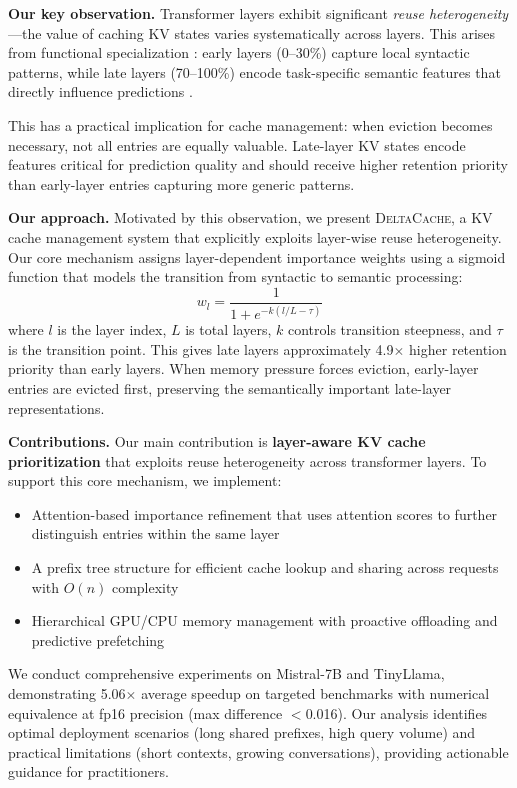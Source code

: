 \documentclass[10pt,conference]{IEEEtran}
\newcommand{\deltacache}{\textsc{DeltaCache}}
\begin{document}
\textbf{Our key observation.} Transformer layers exhibit significant \emph{reuse heterogeneity}---the value of caching KV states varies systematically across layers. This arises from functional specialization \cite{rogers2020primer,elhage2021mathematical}: early layers (0--30\%) capture local syntactic patterns, while late layers (70--100\%) encode task-specific semantic features that directly influence predictions \cite{geva2023dissecting}.

This has a practical implication for cache management: when eviction becomes necessary, not all entries are equally valuable. Late-layer KV states encode features critical for prediction quality and should receive higher retention priority than early-layer entries capturing more generic patterns.

\textbf{Our approach.} Motivated by this observation, we present \deltacache{}, a KV cache management system that explicitly exploits layer-wise reuse heterogeneity. Our core mechanism assigns layer-dependent importance weights using a sigmoid function that models the transition from syntactic to semantic processing:
\begin{equation}
w_l = \frac{1}{1 + e^{-k(l/L - \tau)}}
\end{equation}
where $l$ is the layer index, $L$ is total layers, $k$ controls transition steepness, and $\tau$ is the transition point. This gives late layers approximately 4.9$\times$ higher retention priority than early layers. When memory pressure forces eviction, early-layer entries are evicted first, preserving the semantically important late-layer representations.

\textbf{Contributions.} Our main contribution is \textbf{layer-aware KV cache prioritization} that exploits reuse heterogeneity across transformer layers. To support this core mechanism, we implement:
\begin{itemize}
\item Attention-based importance refinement that uses attention scores to further distinguish entries within the same layer
\item A prefix tree structure for efficient cache lookup and sharing across requests with $O(n)$ complexity
\item Hierarchical GPU/CPU memory management with proactive offloading and predictive prefetching
\end{itemize}

We conduct comprehensive experiments on Mistral-7B and TinyLlama, demonstrating 5.06$\times$ average speedup on targeted benchmarks with numerical equivalence at fp16 precision (max difference $<$0.016). Our analysis identifies optimal deployment scenarios (long shared prefixes, high query volume) and practical limitations (short contexts, growing conversations), providing actionable guidance for practitioners.
\end{document}
